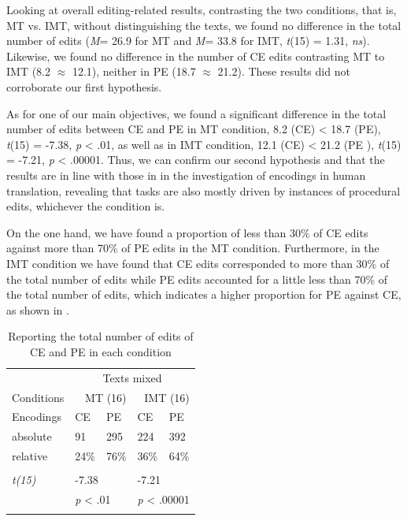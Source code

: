 \documentclass[output=paper]{langsci/langscibook}
\begin{document}
Looking at overall editing-related results, contrasting the two conditions, that is,  MT vs. IMT, without distinguishing the texts, we found no difference in the total number of edits (\textit{M}= 26.9 for MT and \textit{M}= 33.8 for IMT, \textit{t}(15) = 1.31, \textit{ns}). Likewise, we found no difference in the number of CE edits contrasting MT to IMT (8.2 ${\approx}$ 12.1), neither in PE (18.7 ${\approx}$ 21.2). These results did not corroborate our first hypothesis. 



As for one of our main objectives, we found a significant difference in the total number of edits between CE and PE in MT condition, 8.2 (CE) < 18.7 (PE),               \textit{t}(15) = -7.38, \textit{p} < .01, as well as in IMT condition, 12.1 (CE) < 21.2 (PE ), \textit{t}(15) = -7.21,     \textit{p} < .00001. Thus, we can confirm our second hypothesis and that the results are in line with those in \citet{alves2013} in the investigation of encodings in human translation, revealing that  tasks are also mostly driven by instances of procedural  edits, whichever the condition is.




On the one hand, we have found a proportion of less than 30\% of CE edits against more than 70\% of PE edits in the MT condition. Furthermore, in the IMT condition we have found that CE edits corresponded to more than 30\% of the total number of edits while PE edits accounted for a little less than 70\% of the total number of edits, which indicates a higher proportion for PE against CE, as shown in . 

\begin{table}
\begin{tabularx}{\textwidth}{XXXXX}
\lsptoprule
~ & \multicolumn{4}{c}{Texts mixed}\\
Conditions & \multicolumn{2}{r}{MT (16)\hspace*{2.5cm}} & \multicolumn{2}{r}{IMT (16)\hspace*{2.5cm}}\\
Encodings & {CE } & PE & {CE } & PE\\
\midrule
absolute & {91} & 295 & {224} & 392\\
relative & {24\%} & 76\% & {36\%} & 64\%\\\\
\textit{t(15)} & \multicolumn{2}{l}{-7.38} & \multicolumn{2}{l}{-7.21}\\
~ & \multicolumn{2}{l}{\textit{p} < .01} & \multicolumn{2}{l}{\textit{p} < .00001}\\
\lspbottomrule
\end{tabularx}
\caption{Reporting the total number of edits of CE and PE in each condition}
\label{sarto:tab:3}
\end{table}
\end{document}
